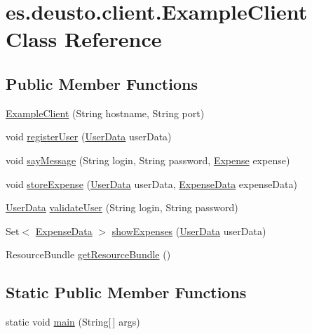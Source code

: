 \hypertarget{classes_1_1deusto_1_1client_1_1_example_client}{}\section{es.\+deusto.\+client.\+Example\+Client Class Reference}
\label{classes_1_1deusto_1_1client_1_1_example_client}
\subsection*{Public Member Functions}
\begin{DoxyCompactItemize}
\item 
\hyperlink{classes_1_1deusto_1_1client_1_1_example_client_afe4bf9d0ff661de1e0ba936df0ce807f}{Example\+Client} (String hostname, String port)
\item 
void \hyperlink{classes_1_1deusto_1_1client_1_1_example_client_a1c17371c17dde2b7664f2ad17ee79e4b}{register\+User} (\hyperlink{classes_1_1deusto_1_1serialization_1_1_user_data}{User\+Data} user\+Data)
\item 
void \hyperlink{classes_1_1deusto_1_1client_1_1_example_client_ae2e3b42bf8ef3a646d92e2b308e38005}{say\+Message} (String login, String password, \hyperlink{classes_1_1deusto_1_1server_1_1jdo_1_1_expense}{Expense} expense)
\item 
void \hyperlink{classes_1_1deusto_1_1client_1_1_example_client_aba5fe3dfb882ef22d0bd49b5915871d3}{store\+Expense} (\hyperlink{classes_1_1deusto_1_1serialization_1_1_user_data}{User\+Data} user\+Data, \hyperlink{classes_1_1deusto_1_1serialization_1_1_expense_data}{Expense\+Data} expense\+Data)
\item 
\hyperlink{classes_1_1deusto_1_1serialization_1_1_user_data}{User\+Data} \hyperlink{classes_1_1deusto_1_1client_1_1_example_client_a740fa7000d0cd30603ce100b299ba8ba}{validate\+User} (String login, String password)
\item 
Set$<$ \hyperlink{classes_1_1deusto_1_1serialization_1_1_expense_data}{Expense\+Data} $>$ \hyperlink{classes_1_1deusto_1_1client_1_1_example_client_a527d2790290c153cae5b16133a38269a}{show\+Expenses} (\hyperlink{classes_1_1deusto_1_1serialization_1_1_user_data}{User\+Data} user\+Data)
\item 
Resource\+Bundle \hyperlink{classes_1_1deusto_1_1client_1_1_example_client_a85a29c19dfbfcad9d08dcc17d688d8d3}{get\+Resource\+Bundle} ()
\end{DoxyCompactItemize}
\subsection*{Static Public Member Functions}
\begin{DoxyCompactItemize}
\item 
static void \hyperlink{classes_1_1deusto_1_1client_1_1_example_client_a9eadbc017db92b83cad1f6b72c10bae2}{main} (String\mbox{[}$\,$\mbox{]} args)
\end{DoxyCompactItemize}


